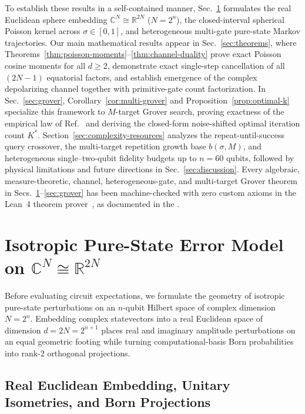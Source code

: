 To establish these results in a self-contained manner, Sec.~\ref{sec:model} formulates the real Euclidean sphere embedding $\mathbb{C}^N \cong \mathbb{R}^{2N}$ ($N = 2^n$), the closed-interval spherical Poisson kernel across $\sigma \in [0, 1]$, and heterogeneous multi-gate pure-state Markov trajectories. Our main mathematical results appear in Sec.~\ref{sec:theorems}, where Theorems~\ref{thm:poisson-moments}--\ref{thm:channel-duality} prove exact Poisson cosine moments for all $d \ge 2$, demonstrate exact single-step cancellation of all $(2N - 1)$ equatorial factors, and establish emergence of the complex depolarizing channel together with primitive-gate count factorization. In Sec.~\ref{sec:grover}, Corollary~\ref{cor:multi-grover} and Proposition~\ref{prop:optimal-k} specialize this framework to $M$-target Grover search, proving exactness of the empirical law of Ref.~\cite{SahaRoyLacalle2026} and deriving the closed-form noise-shifted optimal iteration count $K^*$. Section~\ref{sec:complexity-resources} analyzes the repeat-until-success query crossover, the multi-target repetition growth base $b(\sigma, M)$, and heterogeneous single--two-qubit fidelity budgets up to $n = 60$ qubits, followed by physical limitations and future directions in Sec.~\ref{sec:discussion}. Every algebraic, measure-theoretic, channel, heterogeneous-gate, and multi-target Grover theorem in Secs.~\ref{sec:model}--\ref{sec:grover} has been machine-checked with zero custom axioms in the Lean~4 theorem prover~\cite{MouraUllrich2021,Mathlib2020}, as documented in the \suppRef.

\section{Isotropic Pure-State Error Model on \texorpdfstring{$\mathbb{C}^N \cong \mathbb{R}^{2N}$}{C\^N = R\^(2N)}}
\label{sec:model}

Before evaluating circuit expectations, we formulate the geometry of isotropic pure-state perturbations on an $n$-qubit Hilbert space of complex dimension $N = 2^n$. Embedding complex statevectors into a real Euclidean space of dimension $d = 2N = 2^{n+1}$ places real and imaginary amplitude perturbations on an equal geometric footing while turning computational-basis Born probabilities into rank-2 orthogonal projections.

\subsection{Real Euclidean Embedding, Unitary Isometries, and Born Projections}
\label{sec:realification}

